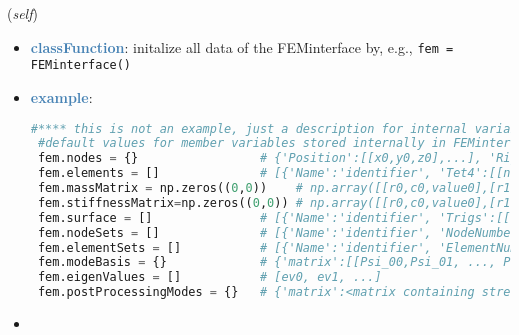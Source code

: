 \begin{itemize}[leftmargin=1.4cm]
\begin{itemize}[leftmargin=1.4cm]
\begin{itemize}[leftmargin=0.5cm]
\begin{itemize}[leftmargin=1.4cm]
\begin{itemize}[leftmargin=1.4cm]
\begin{itemize}[leftmargin=0.5cm]
\begin{flushleft}
({\it self})
\end{flushleft}
\setlength{\itemindent}{0.7cm}
\begin{itemize}[leftmargin=0.7cm]
  \item[--]  \textcolor{steelblue}{\bf classFunction}: initalize all data of the FEMinterface by, e.g., \texttt{fem = FEMinterface()}  \item[--]  \textcolor{steelblue}{\bf example}: \vspace{-12pt}\ei\begin{lstlisting}[language=Python, xleftmargin=36pt]
#**** this is not an example, just a description for internal variables ****
 #default values for member variables stored internally in FEMinterface fem and typical structure:
 fem.nodes = {}                 # {'Position':[[x0,y0,z0],...], 'RigidBodyRxyz':[[x0,y0,z0],...],  },...]                     #dictionary of different node lists
 fem.elements = []              # [{'Name':'identifier', 'Tet4':[[n0,n1,n2,n3],...], 'Hex8':[[n0,...,n7],...],  },...]        #there may be several element sets
 fem.massMatrix = np.zeros((0,0))    # np.array([[r0,c0,value0],[r1,c1,value1], ... ])                                #currently only in SparseCSR format allowed!
 fem.stiffnessMatrix=np.zeros((0,0)) # np.array([[r0,c0,value0],[r1,c1,value1], ... ])                                #currently only in SparseCSR format allowed!
 fem.surface = []               # [{'Name':'identifier', 'Trigs':[[n0,n1,n2],...], 'Quads':[[n0,...,n3],...],  },...]           #surface with faces
 fem.nodeSets = []              # [{'Name':'identifier', 'NodeNumbers':[n_0,...,n_ns], 'NodeWeights':[w_0,...,w_ns]},...]     #for boundary conditions, etc.
 fem.elementSets = []           # [{'Name':'identifier', 'ElementNumbers':[n_0,...,n_ns]},...]                                #for different volumes, etc.
 fem.modeBasis = {}             # {'matrix':[[Psi_00,Psi_01, ..., Psi_0m],...,[Psi_n0,Psi_n1, ..., Psi_nm]],'type':'NormalModes'} #'NormalModes' are eigenmodes, 'HCBmodes' are Craig-Bampton modes including static modes
 fem.eigenValues = []           # [ev0, ev1, ...]                                                                             #eigenvalues according to eigenvectors in mode basis
 fem.postProcessingModes = {}   # {'matrix':<matrix containing stress components (xx,yy,zz,yz,xz,xy) in each column, rows are for every mesh node>,'outputVariableType':exudyn.OutputVariableType.StressLocal}\end{lstlisting}\vspace{-24pt}\bi\item[]\vspace{-24pt}\vspace{12pt}\end{itemize}

\end{itemize}
\end{itemize}
\end{itemize}
\end{itemize}
\end{itemize}
\end{itemize}
